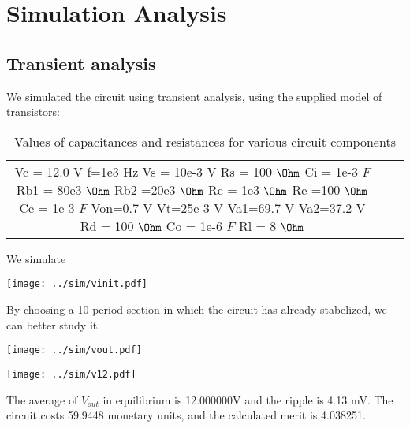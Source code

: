 \section{Simulation Analysis}
\label{sec:simulation}

\subsection{Transient analysis}

We simulated the circuit using transient analysis, using the supplied model of transistors:

\begin{table}[H]
\addtolength{\tabcolsep}{-4pt}
\caption{Values of capacitances and resistances for various circuit components}
\vspace{-3mm}
\begin{tabular}{|c|c|c|}
\hline
Vc = 12.0 V
f=1e3 Hz
Vs = 10e-3 V
Rs = 100 $\Ohm$
Ci = 1e-3 $F$
Rb1 = 80e3 $\Ohm$
Rb2 =20e3 $\Ohm$
Rc = 1e3 $\Ohm$
Re =100 $\Ohm$
Ce = 1e-3 $F$
Von=0.7 V
Vt=25e-3 V
Va1=69.7 V
Va2=37.2 V
Rd = 100 $\Ohm$
Co = 1e-6 $F$
Rl = 8 $\Ohm$

\hline
\end{tabular}
\label{tab:Components}
\end{table}

\par

We simulate 

\texttt{[image: ../sim/vinit.pdf]}

\par

By choosing a 10 period section in which the circuit has already stabelized, we can better study it.

\begin{minipage}[c]{0.50\linewidth}
\texttt{[image: ../sim/vout.pdf]}
\end{minipage} %
\hspace{1mm}
\begin{minipage}[c]{0.50\linewidth}
\texttt{[image: ../sim/v12.pdf]}
\end{minipage}
    
The average of $V_{out}$ in equilibrium is 12.000000V and the ripple is 4.13 mV. The circuit costs 59.9448 monetary units, and the calculated merit is 4.038251.
